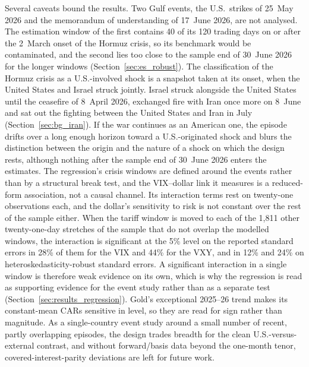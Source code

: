 Several caveats bound the results. Two Gulf events, the U.S.\ strikes of 25~May 2026 and the memorandum of understanding of 17~June 2026, are not analysed. The estimation window of the first contains 40 of its 120 trading days on or after the 2~March onset of the Hormuz crisis, so its benchmark would be contaminated, and the second lies too close to the sample end of 30~June 2026 for the longer windows (Section~\ref{sec:es_robust}). The classification of the Hormuz crisis as a U.S.-involved shock is a snapshot taken at its onset, when the United States and Israel struck jointly. Israel struck alongside the United States until the ceasefire of 8~April 2026, exchanged fire with Iran once more on 8~June and sat out the fighting between the United States and Iran in July (Section~\ref{sec:bg_iran}). If the war continues as an American one, the episode drifts over a long enough horizon toward a U.S.-originated shock and blurs the distinction between the origin and the nature of a shock on which the design rests, although nothing after the sample end of 30~June 2026 enters the estimates. The regression's crisis windows are defined around the events rather than by a structural break test, and the VIX--dollar link it measures is a reduced-form association, not a causal channel. Its interaction terms rest on twenty-one observations each, and the dollar's sensitivity to risk is not constant over the rest of the sample either. When the tariff window is moved to each of the 1,811 other twenty-one-day stretches of the sample that do not overlap the modelled windows, the interaction is significant at the 5\% level on the reported standard errors in 28\% of them for the VIX and 44\% for the VXY, and in 12\% and 24\% on heteroskedasticity-robust standard errors. A significant interaction in a single window is therefore weak evidence on its own, which is why the regression is read as supporting evidence for the event study rather than as a separate test (Section~\ref{sec:results_regression}). Gold's exceptional 2025--26
trend makes its constant-mean CARs
sensitive in level, so they are read for sign rather than magnitude. As a single-country
event study around a small number of recent, partly overlapping episodes, the design trades
breadth for the clean U.S.-versus-external contrast, and without forward/basis data beyond
the one-month tenor, covered-interest-parity deviations are left for future work.
